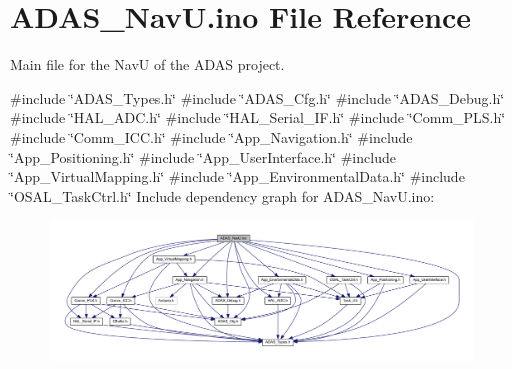 \hypertarget{_a_d_a_s___nav_u_8ino}{}\section{A\+D\+A\+S\+\_\+\+Nav\+U.\+ino File Reference}
\label{_a_d_a_s___nav_u_8ino}


Main file for the NavU of the A\+D\+AS project.  


{\ttfamily \#include \char`\"{}A\+D\+A\+S\+\_\+\+Types.\+h\char`\"{}}\newline
{\ttfamily \#include \char`\"{}A\+D\+A\+S\+\_\+\+Cfg.\+h\char`\"{}}\newline
{\ttfamily \#include \char`\"{}A\+D\+A\+S\+\_\+\+Debug.\+h\char`\"{}}\newline
{\ttfamily \#include \char`\"{}H\+A\+L\+\_\+\+A\+D\+C.\+h\char`\"{}}\newline
{\ttfamily \#include \char`\"{}H\+A\+L\+\_\+\+Serial\+\_\+\+I\+F.\+h\char`\"{}}\newline
{\ttfamily \#include \char`\"{}Comm\+\_\+\+P\+L\+S.\+h\char`\"{}}\newline
{\ttfamily \#include \char`\"{}Comm\+\_\+\+I\+C\+C.\+h\char`\"{}}\newline
{\ttfamily \#include \char`\"{}App\+\_\+\+Navigation.\+h\char`\"{}}\newline
{\ttfamily \#include \char`\"{}App\+\_\+\+Positioning.\+h\char`\"{}}\newline
{\ttfamily \#include \char`\"{}App\+\_\+\+User\+Interface.\+h\char`\"{}}\newline
{\ttfamily \#include \char`\"{}App\+\_\+\+Virtual\+Mapping.\+h\char`\"{}}\newline
{\ttfamily \#include \char`\"{}App\+\_\+\+Environmental\+Data.\+h\char`\"{}}\newline
{\ttfamily \#include \char`\"{}O\+S\+A\+L\+\_\+\+Task\+Ctrl.\+h\char`\"{}}\newline
Include dependency graph for A\+D\+A\+S\+\_\+\+Nav\+U.\+ino\+:\nopagebreak
\begin{figure}[H]
\begin{center}
\leavevmode
\includegraphics[width=350pt]{_a_d_a_s___nav_u_8ino__incl}
\end{center}
\end{figure}
